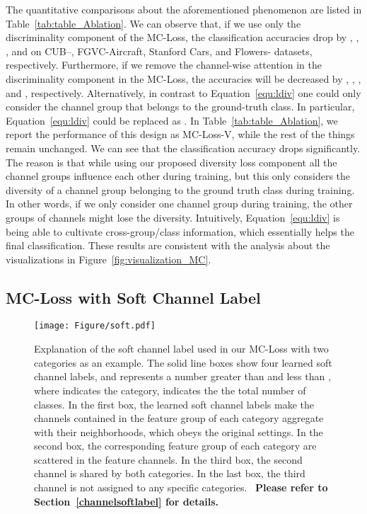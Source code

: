 \documentclass[journal]{IEEEtran}
\begin{document}
The quantitative comparisons about the aforementioned phenomenon are listed in Table~\ref{tab:table_Ablation}. We can observe that, if we use only the discriminality component of the MC-Loss, the classification accuracies drop by , , , and  on CUB--, FGVC-Aircraft, Stanford Cars, and Flowers- datasets, respectively. Furthermore, if we remove the channel-wise attention in the discriminality component in the MC-Loss, the accuracies will be decreased by , , , and , respectively. Alternatively, in contrast to Equation~\ref{equ:ldiv} one could only consider the channel group that belongs to the ground-truth class. In particular, Equation~\ref{equ:ldiv} could be replaced as . In Table~\ref{tab:table_Ablation}, we report the performance of this design as MC-Loss-V, while the rest of the things remain unchanged. We can see that the classification accuracy drops significantly. The reason is that while using our proposed diversity loss component all the channel groups influence each other during  training, but this   only considers the diversity of a channel group belonging to the ground truth class during training. In other words, if we only consider one channel group during training, the other groups of channels might lose the diversity. Intuitively, Equation~\ref{equ:ldiv} is being able to cultivate cross-group/class information, which essentially helps the final classification. These results are consistent with the analysis about the visualizations in Figure~\ref{fig:visualization_MC}.






\subsection{MC-Loss with Soft Channel Label}\label{WMC}

\begin{figure}[!t]
  \begin{center}
    \texttt{[image: Figure/soft.pdf]}
  \end{center}
  \vspace{-5mm}
  \caption{Explanation of the soft channel label used in our MC-Loss with two categories as an example. The solid line boxes show four learned soft channel labels, and  represents a number greater than  and less than , where  indicates the category,   indicates the the total number of classes. 
  In the first box, the learned soft channel labels make the channels contained in the feature group of each category aggregate with their neighborhoods, which obeys the original settings. 
  In the second box, the corresponding feature group of each category are scattered in the feature channels.
  In the third box, the second channel is shared by both categories.
  In the last box, the third channel is not assigned to any specific categories.
  ~\textbf{Please refer to Section~\ref{channelsoftlabel} for details.}
  }
  \label{fig:soft}
    \vspace{-5mm}
\end{figure}
\end{document}
